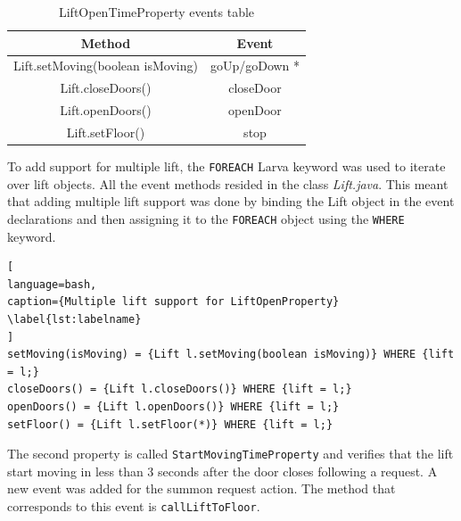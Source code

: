 \documentclass[a4paper, 12pt]{article}
\begin{document}
\begin{table}[h]
   \centering
   \begin{tabular}{@{}  |c|c| @{}} %
      \toprule
      Method    & Event \\
      \midrule
      Lift.setMoving(boolean isMoving)   &  goUp/goDown *\\
      Lift.closeDoors()       & closeDoor  \\
      Lift.openDoors()       & openDoor  \\
      Lift.setFloor() & stop    \\
      \bottomrule
   \end{tabular}
   \caption{LiftOpenTimeProperty events table}
   \label{tab:lift-open-time-property}
\end{table}

To add support for multiple lift, the \texttt{FOREACH} Larva keyword was used to iterate over lift objects. All the event methods resided in the class \textit{Lift.java}. This meant that adding multiple lift support was done by binding the Lift object in the event declarations and then assigning it to the \texttt{FOREACH} object using the \texttt{WHERE} keyword.


\begin{lstlisting}[
language=bash, 
caption={Multiple lift support for LiftOpenProperty}
\label{lst:labelname}
]
setMoving(isMoving) = {Lift l.setMoving(boolean isMoving)} WHERE {lift = l;} 
closeDoors() = {Lift l.closeDoors()} WHERE {lift = l;}
openDoors() = {Lift l.openDoors()} WHERE {lift = l;}
setFloor() = {Lift l.setFloor(*)} WHERE {lift = l;}
\end{lstlisting}

The second property is called \texttt{StartMovingTimeProperty} and verifies that the lift start moving in less than 3 seconds after the door closes following a request. A new event was added for the summon request action. The method that corresponds to this event is \texttt{callLiftToFloor}. \\
\end{document}
